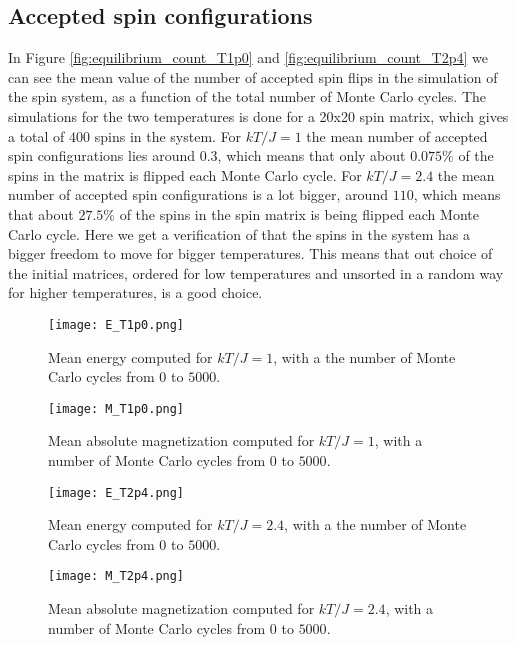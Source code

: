 \documentclass[12pt]{article}
\begin{document}
\begin{flushleft}
\subsection{Accepted spin configurations}
In Figure \ref{fig:equilibrium_count_T1p0} and \ref{fig:equilibrium_count_T2p4} we can see the mean value of the number of accepted spin flips in the simulation of the spin system, as a function of the total number of Monte Carlo cycles. The simulations for the two temperatures is done for a 20x20 spin matrix, which gives a total of $400$ spins in the system. For $kT/J=1$ the mean number of accepted spin configurations lies around $0.3$, which means that only about $0.075\%$ of the spins in the matrix is flipped each Monte Carlo cycle. For $kT/J = 2.4$ the mean number of accepted spin configurations is a lot bigger, around $110$, which means that about $27.5\%$ of the spins in the spin matrix is being flipped each Monte Carlo cycle. Here we get a verification of that the spins in the system has a bigger freedom to move for bigger temperatures. This means that out choice of the initial matrices, ordered for low temperatures and unsorted in a random way for higher temperatures, is a good choice.

\newpage
\begin{figure}[!h]
\centering
\begin{minipage}[b]{0.45\linewidth}
    \texttt{[image: E\_T1p0.png]}
  \caption{\label{fig:equilibrium_E_T1p0}Mean energy computed for $kT/J = 1$, with a the number of Monte Carlo cycles from $0$ to $5000$.}
\end{minipage}
\quad
\begin{minipage}[b]{0.45\linewidth}
    \texttt{[image: M\_T1p0.png]}
  \caption{Mean absolute magnetization computed for $kT/J = 1$, with a number of Monte Carlo cycles from $0$ to $5000$.}
  \label{fig:equilibrium_M_T1p0}
\end{minipage}
\end{figure}

\begin{figure}[!h]
\centering
\begin{minipage}[b]{0.45\linewidth}
    \texttt{[image: E\_T2p4.png]}
  \caption{Mean energy computed for $kT/J = 2.4$, with a the number of Monte Carlo cycles from $0$ to $5000$.}
  \label{fig:equilibrium_E_T2p4}
\end{minipage}
\quad
\begin{minipage}[b]{0.45\linewidth}
    \texttt{[image: M\_T2p4.png]}
  \caption{Mean absolute magnetization computed for $kT/J = 2.4$, with a number of Monte Carlo cycles from $0$ to $5000$.}
  \label{fig:equilibrium_M_T2p4}
\end{minipage}
\end{figure}



\end{flushleft}
\end{document}
